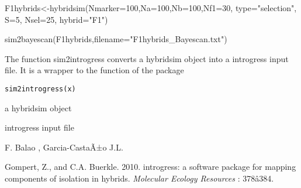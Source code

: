 \documentclass[letterpaper]{book}
\begin{document}
%
\begin{Examples}
\begin{ExampleCode}
F1hybrids<-hybridsim(Nmarker=100,Na=100,Nb=100,Nf1=30, type="selection", S=5, Nsel=25, hybrid="F1")

sim2bayescan(F1hybrids,filename="F1hybrids_Bayescan.txt")
\end{ExampleCode}
\end{Examples}
%
\begin{Description}\relax
The function sim2introgress converts a hybridsim object into a introgress  input file. It is a wrapper to the function  of the package 

\end{Description}
%
\begin{Usage}
\begin{verbatim}
sim2introgress(x)

\end{verbatim}
\end{Usage}
%
\begin{Arguments}
\begin{ldescription}

\item[\code{x}] 
a hybridsim object

\end{ldescription}
\end{Arguments}
%
\begin{Value}
introgress input file
\end{Value}
%
\begin{Author}\relax
F. Balao , Garcia-CastaÃ±o J.L.
\end{Author}
%
\begin{References}\relax
Gompert, Z., and C.A. Buerkle. 2010. introgress: a software package for mapping components of isolation in hybrids. \emph{Molecular Ecology Resources} : 378â384.
\end{References}
%
\begin{SeeAlso}\relax
{}
\end{SeeAlso}
\end{document}
